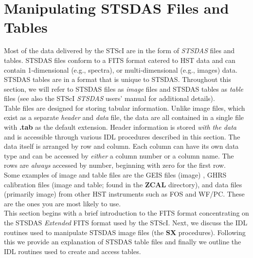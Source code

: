 
%
\Large
\section{\bf Manipulating STSDAS Files and Tables}
\label{fits}
\label{sdas tables and files}
\normalsize

Most of 
the data delivered by the STScI are in the form of {\it STSDAS} 
files and tables.  STSDAS files conform to a FITS format catered to 
HST data and can contain 1-dimensional (e.g., spectra), or multi-dimensional 
(e.g., images) data.  STSDAS tables are in a format that is unique to STSDAS. 
Throughout this section, we will refer to STSDAS files as {\it image} files 
and STSDAS tables as {\it table} files (see also the STScI 
{\it STSDAS} users' manual for additional details).\\

Table files are designed for storing tabular information. Unlike image 
files, which exist as a separate {\it header} and {\it data} file, the data 
are all contained in a single file with {\bf .tab} as the default 
extension.  Header information is stored {\it with the data} and is 
accessible through various IDL procedures described in this section. The data 
itself is arranged by row and column. Each column can have its own data type 
and can be accessed by {\it either} a column number or a column name. The 
rows are {\it always} accessed by number, beginning with zero for the 
first row.\\

Some examples of image and table files are the GEIS files (image) , 
GHRS calibration files (image and table; found in the {\bf ZCAL} directory), 
and data files (primarily image) from other HST instruments such as FOS and 
WF/PC.  These are the ones you are most likely to use.\\

This section 
begins with a brief introduction to the FITS format concentrating
on the STSDAS {\it Extended} FITS format used by the STScI.  Next, we 
discuss the IDL routines used to manipulate STSDAS image files (the {\bf SX} 
procedures).  Following this we provide an explanation of STSDAS table files 
and finally we outline the IDL routines used to create and access tables.\\

